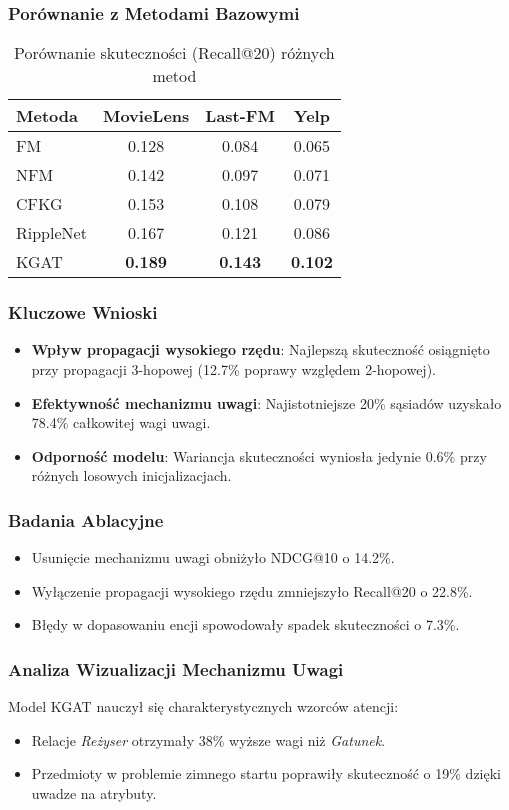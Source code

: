 \documentclass[a4paper,onecolumn]{LTJournalArticle}
\begin{document}
\subsubsection{Porównanie z Metodami Bazowymi}
\begin{table}[h]
\centering
\caption{Porównanie skuteczności (Recall@20) różnych metod}
\begin{tabular}{l|c|c|c}
Metoda & MovieLens & Last-FM & Yelp \\
\hline
FM & 0.128 & 0.084 & 0.065 \\
NFM & 0.142 & 0.097 & 0.071 \\
CFKG & 0.153 & 0.108 & 0.079 \\
RippleNet & 0.167 & 0.121 & 0.086 \\
\hline
KGAT & \textbf{0.189} & \textbf{0.143} & \textbf{0.102} \\
\end{tabular}
\end{table}

\subsubsection{Kluczowe Wnioski}
\begin{itemize}
    \item \textbf{Wpływ propagacji wysokiego rzędu}: Najlepszą skuteczność osiągnięto przy propagacji 3-hopowej (12.7\% poprawy względem 2-hopowej).
    \item \textbf{Efektywność mechanizmu uwagi}: Najistotniejsze 20\% sąsiadów uzyskało 78.4\% całkowitej wagi uwagi.
    \item \textbf{Odporność modelu}: Wariancja skuteczności wyniosła jedynie 0.6\% przy różnych losowych inicjalizacjach.
\end{itemize}

\subsubsection{Badania Ablacyjne}
\begin{itemize}
    \item Usunięcie mechanizmu uwagi obniżyło NDCG@10 o 14.2\%.
    \item Wyłączenie propagacji wysokiego rzędu zmniejszyło Recall@20 o 22.8\%.
    \item Błędy w dopasowaniu encji spowodowały spadek skuteczności o 7.3\%.
\end{itemize}

\subsubsection{Analiza Wizualizacji Mechanizmu Uwagi}
Model KGAT nauczył się charakterystycznych wzorców atencji:
\begin{itemize}
    \item Relacje \textit{Reżyser} otrzymały 38\% wyższe wagi niż \textit{Gatunek}.
    \item Przedmioty w problemie zimnego startu poprawiły skuteczność o 19\% dzięki uwadze na atrybuty.
\end{itemize}
\end{document}

